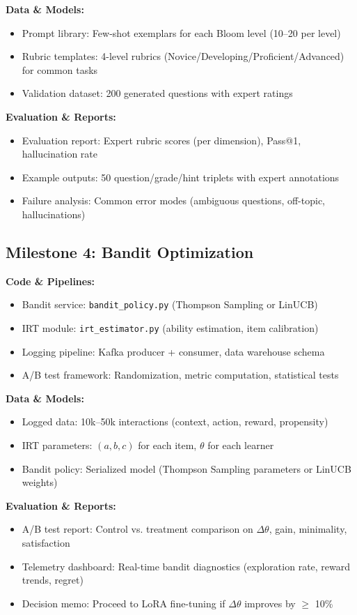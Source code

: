 \documentclass[11pt,letterpaper]{article}
\begin{document}
\textbf{Data \& Models:}
\begin{itemize}
\item Prompt library: Few-shot exemplars for each Bloom level (10--20 per level)
\item Rubric templates: 4-level rubrics (Novice/Developing/Proficient/Advanced) for common tasks
\item Validation dataset: 200 generated questions with expert ratings
\end{itemize}

\textbf{Evaluation \& Reports:}
\begin{itemize}
\item Evaluation report: Expert rubric scores (per dimension), Pass@1, hallucination rate
\item Example outputs: 50 question/grade/hint triplets with expert annotations
\item Failure analysis: Common error modes (ambiguous questions, off-topic, hallucinations)
\end{itemize}

\subsection{Milestone 4: Bandit Optimization}

\textbf{Code \& Pipelines:}
\begin{itemize}
\item Bandit service: \texttt{bandit\_policy.py} (Thompson Sampling or LinUCB)
\item IRT module: \texttt{irt\_estimator.py} (ability estimation, item calibration)
\item Logging pipeline: Kafka producer + consumer, data warehouse schema
\item A/B test framework: Randomization, metric computation, statistical tests
\end{itemize}

\textbf{Data \& Models:}
\begin{itemize}
\item Logged data: 10k--50k interactions (context, action, reward, propensity)
\item IRT parameters: $(a, b, c)$ for each item, $\theta$ for each learner
\item Bandit policy: Serialized model (Thompson Sampling parameters or LinUCB weights)
\end{itemize}

\textbf{Evaluation \& Reports:}
\begin{itemize}
\item A/B test report: Control vs. treatment comparison on $\Delta\theta$, gain, minimality, satisfaction
\item Telemetry dashboard: Real-time bandit diagnostics (exploration rate, reward trends, regret)
\item Decision memo: Proceed to LoRA fine-tuning if $\Delta\theta$ improves by $\geq$ 10\%
\end{itemize}
\end{document}
